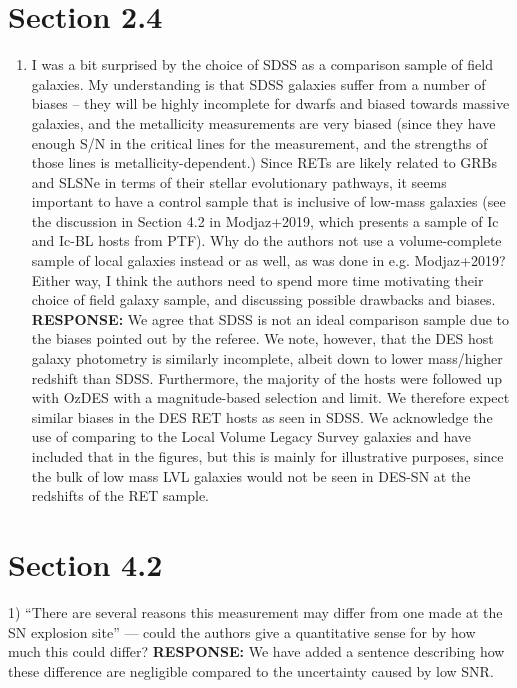 \documentclass{article}
\begin{document}
\section*{Section 2.4} 

\begin{enumerate}
    \item I was a bit surprised by the choice of SDSS as a comparison sample of field galaxies. My understanding is that SDSS galaxies suffer from a number of biases -- they will be highly incomplete for dwarfs and biased towards massive galaxies, and the metallicity measurements are very biased (since they have enough S/N in the critical lines for the measurement, and the strengths of those lines is metallicity-dependent.) Since RETs are likely related to GRBs and SLSNe in terms of their stellar evolutionary pathways, it seems important to have a control sample that is inclusive of low-mass galaxies (see the discussion in Section 4.2 in Modjaz+2019, which presents a sample of Ic and Ic-BL hosts from PTF). Why do the authors not use a volume-complete sample of local galaxies instead or as well, as was done in e.g. Modjaz+2019? Either way, I think the authors need to spend more time motivating their choice of field galaxy sample, and discussing possible drawbacks and biases.
   \vskip0.1cm
 {\bf RESPONSE: } We agree that SDSS is not an ideal comparison sample due to the biases pointed out by the referee. We note, however, that the DES host galaxy photometry is similarly incomplete, albeit down to lower mass/higher redshift than SDSS. Furthermore, the majority of the hosts were followed up with OzDES with a magnitude-based selection and limit. We therefore expect similar biases in the DES RET hosts as seen in SDSS. 
 We acknowledge the use of comparing to the Local Volume Legacy Survey galaxies and have included that in the figures, but this is mainly for illustrative purposes, since the bulk of low mass LVL galaxies would not be seen in DES-SN at the redshifts of the RET sample.
    
\end{enumerate}

\section*{Section 4.2}
1) “There are several reasons this measurement may differ from one made at the SN explosion site” — could the authors give a quantitative sense for by how much this could differ?
   \vskip0.1cm
 {\bf RESPONSE: } We have added a sentence describing how these difference are negligible compared to the uncertainty caused by low SNR.
\end{document}
